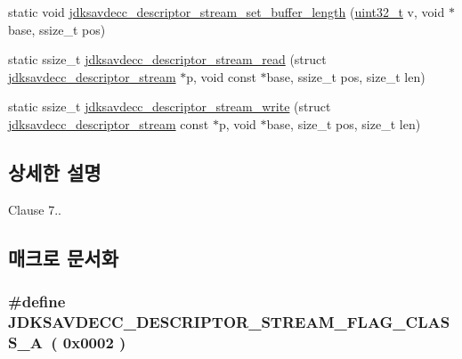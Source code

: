 \begin{DoxyCompactItemize}
\item 
static void \hyperlink{group__descriptor__stream_ga9f3b0992c3e55d07e62a0f720537549b}{jdksavdecc\+\_\+descriptor\+\_\+stream\+\_\+set\+\_\+buffer\+\_\+length} (\hyperlink{parse_8c_a6eb1e68cc391dd753bc8ce896dbb8315}{uint32\+\_\+t} v, void $\ast$base, ssize\+\_\+t pos)
\item 
static ssize\+\_\+t \hyperlink{group__descriptor__stream_gaa2b221c25b7431aec5785632687d06c0}{jdksavdecc\+\_\+descriptor\+\_\+stream\+\_\+read} (struct \hyperlink{structjdksavdecc__descriptor__stream}{jdksavdecc\+\_\+descriptor\+\_\+stream} $\ast$p, void const $\ast$base, ssize\+\_\+t pos, size\+\_\+t len)
\item 
static ssize\+\_\+t \hyperlink{group__descriptor__stream_ga0307af9834e47b25feaae00c72675d2c}{jdksavdecc\+\_\+descriptor\+\_\+stream\+\_\+write} (struct \hyperlink{structjdksavdecc__descriptor__stream}{jdksavdecc\+\_\+descriptor\+\_\+stream} const $\ast$p, void $\ast$base, size\+\_\+t pos, size\+\_\+t len)
\end{DoxyCompactItemize}


\subsection{상세한 설명}
Clause 7.. 

\subsection{매크로 문서화}
\subsubsection[{\texorpdfstring{J\+D\+K\+S\+A\+V\+D\+E\+C\+C\+\_\+\+D\+E\+S\+C\+R\+I\+P\+T\+O\+R\+\_\+\+S\+T\+R\+E\+A\+M\+\_\+\+F\+L\+A\+G\+\_\+\+C\+L\+A\+S\+S\+\_\+A}{JDKSAVDECC_DESCRIPTOR_STREAM_FLAG_CLASS_A}}]{\setlength{\rightskip}{0pt plus 5cm}\#define J\+D\+K\+S\+A\+V\+D\+E\+C\+C\+\_\+\+D\+E\+S\+C\+R\+I\+P\+T\+O\+R\+\_\+\+S\+T\+R\+E\+A\+M\+\_\+\+F\+L\+A\+G\+\_\+\+C\+L\+A\+S\+S\+\_\+A~( 0x0002 )}\hypertarget{group__descriptor__stream_ga5a54c0b32f11463c90d818dee6fc3d2f}{}\label{group__descriptor__stream_ga5a54c0b32f11463c90d818dee6fc3d2f}


